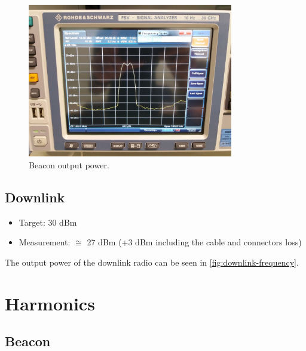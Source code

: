 \documentclass[12pt]{book}
\begin{document}
\begin{figure}[H]
    \begin{center}
        \includegraphics[width=0.8\textwidth]{figures/tests/beacon_output_power.jpg}
        \caption{Beacon output power.}
        \label{fig:beacon-output-power}
    \end{center}
\end{figure}

\subsection{Downlink}

\begin{itemize}
    \item Target: 30 dBm
    \item Measurement: $\cong$ 27 dBm (+3 dBm including the cable and connectors loss)
\end{itemize}

The output power of the downlink radio can be seen in \autoref{fig:downlink-frequency}.

\section{Harmonics}

\subsection{Beacon}
\end{document}

